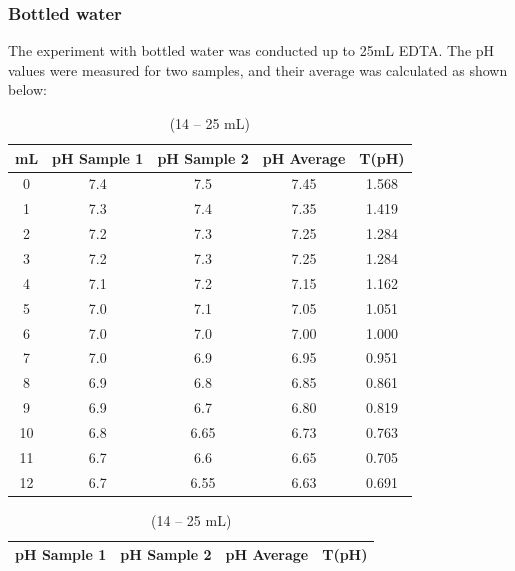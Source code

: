 \documentclass{article}
\begin{document}
\subsubsection{Bottled water}
The experiment with bottled water was conducted up to 25mL EDTA. The pH values were measured for two samples, and their average was calculated as shown below:
\vspace*{.5cm}
\renewcommand{\arraystretch}{1.2}
\begin{table}[h!]
    \caption{Bottled water pH measurements}
    \hspace*{-1.5cm}
    \begin{minipage}[t]{0.45\textwidth}
        \centering
        \caption*{(0 -- 13 mL)}
        \begin{tabular}{@{}ccccc@{}}
            \toprule
            \textbf{mL} & \textbf{pH Sample 1} & \textbf{pH Sample 2} & \textbf{pH Average} & \textbf{T(pH)}\\ \midrule
            0  & 7.4 & 7.5 & 7.45 & 1.568\\
            1  & 7.3 & 7.4 & 7.35 & 1.419\\
            2  & 7.2 & 7.3 & 7.25 & 1.284\\
            3  & 7.2 & 7.3 & 7.25 & 1.284\\
            4  & 7.1 & 7.2 & 7.15 & 1.162\\
            5  & 7.0 & 7.1 & 7.05 & 1.051\\
            6  & 7.0 & 7.0 & 7.00 & 1.000\\
            7  & 7.0 & 6.9 & 6.95 & 0.951\\
            8  & 6.9 & 6.8 & 6.85 & 0.861\\
            9  & 6.9 & 6.7 & 6.80 & 0.819\\
            10 & 6.8 & 6.65 & 6.73 & 0.763\\
            11 & 6.7 & 6.6 & 6.65 & 0.705\\
            12 & 6.7 & 6.55 & 6.63 & 0.691\\
            \bottomrule
        \end{tabular}
    \end{minipage}
    \hfill
    \begin{minipage}[t]{0.45\textwidth}
        \centering
        \caption*{(14 -- 25 mL)}
        \begin{tabular}{@{}cccc@{}}
            \toprule
            \textbf{pH Sample 1} & \textbf{pH Sample 2} & \textbf{pH Average} & \textbf{T(pH)}\\ \midrule

\end{tabular}
\end{minipage}
\end{table}
\end{document}

